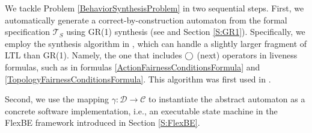 

We tackle Problem \ref{BehaviorSynthesisProblem} in two sequential steps.
First, we automatically generate a correct-by-construction automaton from the formal specification $\mathcal{T}_S$ using GR(1) synthesis (see \cite{piterman_06} and Section \ref{S:GR1}).
Specifically, we employ the synthesis algorithm in \cite{SLUGS}, which can handle a slightly larger fragment of LTL than GR(1).
Namely, the one that includes $\operatorname{\bigcirc}$ (next) operators in liveness formulas, such as in formulas \eqref{ActionFairnessConditionsFormula} and \eqref{TopologyFairnessConditionsFormula}.
This algorithm was first used in \cite{Vasu2013ICRA}.

Second, we use the mapping $\gamma: \mathcal{D} \rightarrow \mathcal{C}$ to instantiate the abstract automaton as a concrete software implementation, i.e., an executable state machine in the FlexBE framework introduced in Section \ref{S:FlexBE}.

